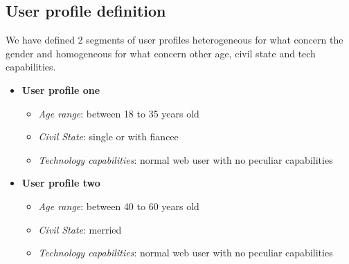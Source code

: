 \subsection{User profile definition}
We have defined 2 segments of user profiles heterogeneous for what concern the gender and homogeneous for what concern 	other age, civil state and tech capabilities.
\begin{itemize}
		\item \textbf{User profile one}
			\begin{itemize}
				\item \emph{Age range}: between 18 to 35 years old
				\item \emph{Civil State}: single or with fiancee
				\item \emph{Technology capabilities}: normal web user with no peculiar capabilities
			\end{itemize}
		\item \textbf{User profile two}
			\begin{itemize}
				\item \emph{Age range}: between 40 to 60 years old
				\item \emph{Civil State}: merried
				\item \emph{Technology capabilities}: normal web user with no peculiar capabilities
			\end{itemize}
\end{itemize}



